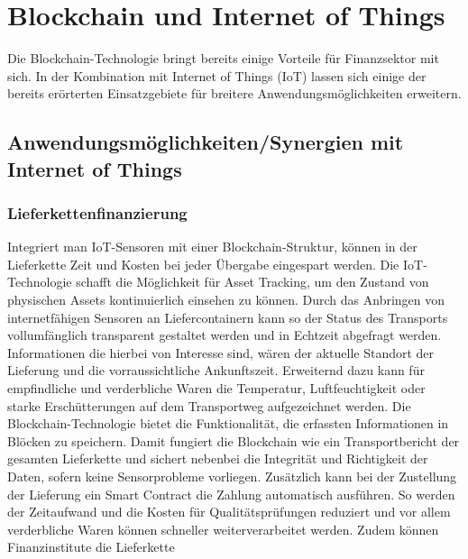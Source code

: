 \section{Blockchain und Internet of Things}
Die Blockchain-Technologie bringt bereits einige Vorteile für Finanzsektor mit sich.
In der Kombination mit Internet of Things (IoT) lassen sich einige der bereits erörterten Einsatzgebiete
für breitere Anwendungsmöglichkeiten erweitern.

\subsection{Anwendungsmöglichkeiten/Synergien mit Internet of Things}

\subsubsection{Lieferkettenfinanzierung}
Integriert man IoT-Sensoren mit einer Blockchain-Struktur, können in der Lieferkette Zeit und Kosten bei
jeder Übergabe eingespart werden.
Die IoT-Technologie schafft die Möglichkeit für Asset Tracking, um den Zustand von physischen Assets
kontinuierlich einsehen zu können. Durch das Anbringen von internetfähigen Sensoren an 
Liefercontainern kann so der Status des Transports vollumfänglich transparent gestaltet
werden und in Echtzeit abgefragt werden. 
Informationen die hierbei von Interesse sind, wären der aktuelle Standort der Lieferung und
die vorraussichtliche Ankunftszeit. Erweiternd dazu kann für empfindliche und 
verderbliche Waren die Temperatur, Luftfeuchtigkeit oder starke Erschütterungen auf dem 
Transportweg aufgezeichnet werden.
Die Blockchain-Technologie bietet die Funktionalität, die erfassten Informationen in Blöcken
zu speichern. Damit fungiert die Blockchain wie ein Transportbericht der gesamten Lieferkette und 
sichert nebenbei die Integrität und Richtigkeit der Daten, sofern keine Sensorprobleme vorliegen. 
Zusätzlich kann bei der Zustellung der Lieferung ein Smart Contract die Zahlung automatisch ausführen.
So werden der Zeitaufwand und die Kosten für Qualitätsprüfungen reduziert und vor allem verderbliche 
Waren können schneller weiterverarbeitet werden.
Zudem können Finanzinstitute die Lieferkette
\cite[p.~169f]{chowdhary2025smart}


